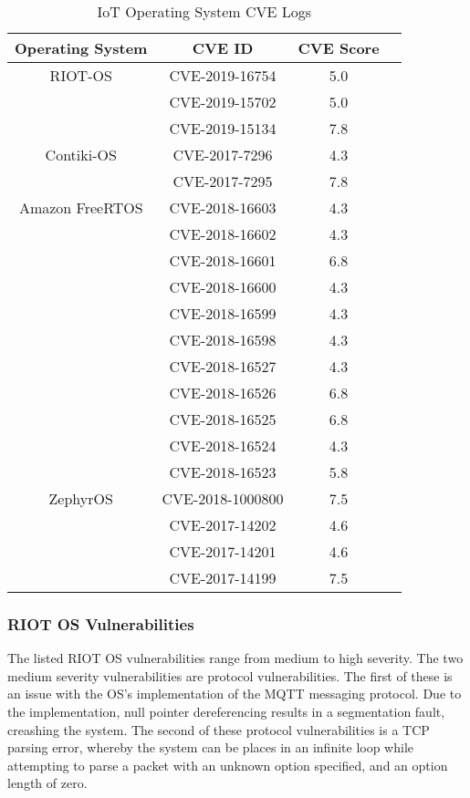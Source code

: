\begin{table}[H]
	\centering
	\caption{IoT Operating System CVE Logs}
	\label{tab:iotCve}
	\begin{tabular}{|c|c|c|c|}
	\hline
	Operating System & CVE ID & CVE Score \\
	\hline\hline
	RIOT-OS & CVE-2019-16754 & 5.0 \\
		& CVE-2019-15702 & 5.0 \\
		& CVE-2019-15134 & 7.8 \\
	\hline
	Contiki-OS & CVE-2017-7296 & 4.3 \\
		   & CVE-2017-7295 & 7.8 \\
	\hline
	Amazon FreeRTOS & CVE-2018-16603 & 4.3 \\
			& CVE-2018-16602 & 4.3 \\
			& CVE-2018-16601 & 6.8 \\
			& CVE-2018-16600 & 4.3 \\
			& CVE-2018-16599 & 4.3 \\
			& CVE-2018-16598 & 4.3 \\
			& CVE-2018-16527 & 4.3 \\
			& CVE-2018-16526 & 6.8 \\
			& CVE-2018-16525 & 6.8 \\
			& CVE-2018-16524 & 4.3 \\
			& CVE-2018-16523 & 5.8 \\
	\hline
	ZephyrOS & CVE-2018-1000800 & 7.5 \\
		 & CVE-2017-14202   & 4.6 \\
		 & CVE-2017-14201   & 4.6 \\
		 & CVE-2017-14199   & 7.5 \\
	\hline\hline
	\end{tabular}
\end{table}

\subsubsection{\textbf{RIOT OS Vulnerabilities}}

The listed RIOT OS vulnerabilities range from medium to high severity. The two
medium severity vulnerabilities are protocol vulnerabilities. The first of these
is an issue with the OS's implementation of the MQTT messaging
protocol\cite{riotCve1}. Due to
the implementation, null pointer dereferencing results in a segmentation fault,
creashing the system\cite{riotMqtt}. The second of these protocol vulnerabilities
is a TCP parsing error\cite{riotCve2}, whereby the system can be places in an infinite loop while
attempting to parse a packet with an  unknown option specified, and an option
length of zero\cite{riotTcp}.


